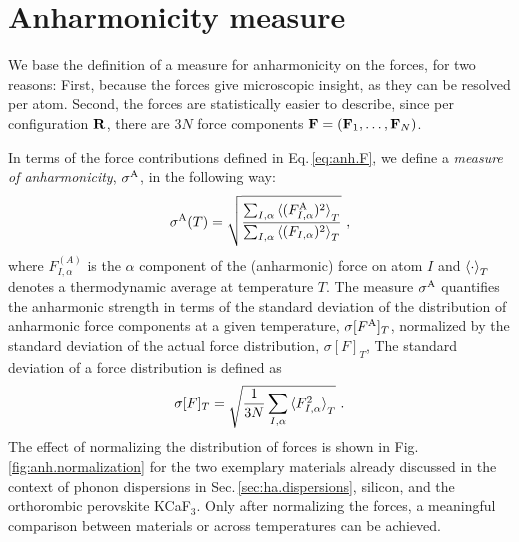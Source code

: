\section{Anharmonicity measure}
\label{sec:anharmonicity_measure}

We base the definition of a measure for anharmonicity on the forces, for two reasons: First, because the forces give microscopic insight, as they can be resolved per atom. Second, the forces are statistically easier to describe, since per configuration $\bf R$, there are $3N$ force components ${\bf F} = ({\bf F}_1, \ldots, {\bf F}_N)$.

In terms of the force contributions defined in Eq.\,\eqref{eq:anh.F}, we define a \emph{measure of anharmonicity}, $\sigma^\mathrm{A}$, in the following way:
\begin{align}
	\sigmaA (T)
		= \sqrt{\frac{\sum_{I, \alpha} \braket{(F^{\rm A}_{I, \alpha})^2}_T}{\sum_{I, \alpha} \braket{(F_{I, \alpha})^2}_T}}~,
	\label{eq:sigmaA}
\end{align}
where $F_{I, \alpha}^{(A)}$ is the $\alpha$ component of the (anharmonic) force on atom $I$ and $\braket{\cdot}_T$ denotes a thermodynamic average at temperature $T$. The measure $\sigma^\mathrm{A}$ quantifies the anharmonic strength in terms of the standard deviation of the distribution of anharmonic force components at a given temperature, $\sigma [F^{\rm A}]_T$, normalized by the standard deviation of the actual force distribution, $\sigma [F]_T$, The standard deviation of a force distribution is defined as
\begin{align}
	\sigma [F]_T 
		= \sqrt{\frac{1}{3N} \sum_{I, \alpha} \braket{F_{I, \alpha}^2}_T}~.
\end{align}
The effect of normalizing the distribution of forces is shown in Fig.\,\ref{fig:anh.normalization} for the two exemplary materials already discussed in the context of phonon dispersions in Sec.\,\ref{sec:ha.dispersions}, silicon, and the orthorombic perovskite KCaF$_3$. Only after normalizing the forces, a meaningful comparison between materials or across temperatures can be achieved.

